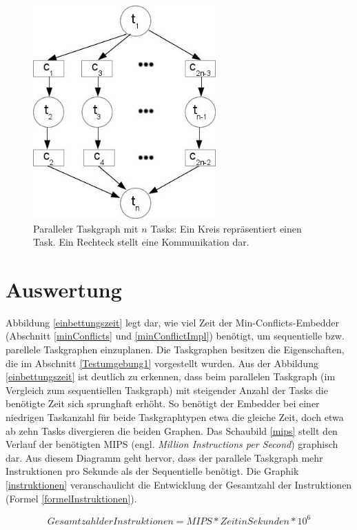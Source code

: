 \begin{figure}[H]\centering
  \includegraphics[width = 70mm]{bilder/parallel.jpg}
  \caption{Paralleler Taskgraph mit $n$ Tasks: Ein Kreis repräsentiert einen Task. Ein Rechteck stellt eine Kommunikation dar.}\label{fig:par}
\end{figure}

\section{Auswertung} \label{Auswertung} 

Abbildung \ref{einbettungszeit} legt dar,  wie viel Zeit der Min-Conflicts-Embedder (Abschnitt \ref{minConflicts} und \ref{minConflictImpl}) benötigt, um sequentielle bzw. parellele Taskgraphen einzuplanen. Die Taskgraphen besitzen die Eigenschaften, die im Abschnitt \ref{Testumgebung1} vorgestellt wurden. Aus der Abbildung \ref{einbettungszeit} ist deutlich zu erkennen, dass beim parallelen Taskgraph  (im Vergleich zum sequentiellen Taskgraph) mit steigender Anzahl der Tasks die benötigte Zeit sich sprunghaft erhöht. So benötigt der Embedder bei einer niedrigen Taskanzahl  für beide Taskgraphtypen etwa die gleiche Zeit, doch etwa ab zehn Tasks divergieren die beiden Graphen. Das Schaubild \ref{mips} stellt den Verlauf der benötigten MIPS (engl. \textit{Million Instructions per Second}) graphisch dar. Aus diesem Diagramm geht hervor, dass der parallele Taskgraph mehr Instruktionen pro Sekunde als der Sequentielle benötigt. Die Graphik \ref{instruktionen} veranschaulicht die Entwicklung der Gesamtzahl der Instruktionen (Formel \ref{formelInstruktionen}).

\begin{equation}
Gesamtzahl der Instruktionen = MIPS * Zeit in Sekunden * 10^6
\label{formelInstruktionen}
\end{equation}

